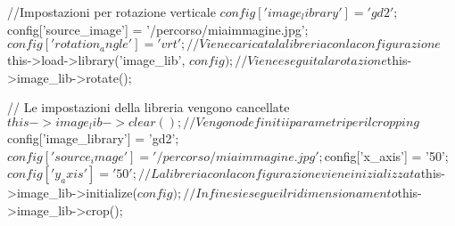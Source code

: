 \begin{code}
//Impostazioni per rotazione verticale  
$config['image_library'] = 'gd2';  
$config['source_image'] = '/percorso/miaimmagine.jpg';  
$config['rotation_angle'] = 'vrt';

// Viene caricata la libreria con la configurazione  
$this->load->library('image_lib', $config);  

// Viene eseguita la rotazione
$this->image_lib->rotate();

// Le impostazioni della libreria vengono cancellate
$this->image_lib->clear(); 

// Vengono definiti i parametri per il cropping
$config['image_library'] = 'gd2';  
$config['source_image'] = '/percorso/miaimmagine.jpg';  
$config['x_axis'] = '50';  
$config['y_axis'] = '50';

// La libreria con la configurazione viene inizializzata
$this->image_lib->initialize($config); 

// Infine si esegue il ridimensionamento
$this->image_lib->crop();  
\end{code}
